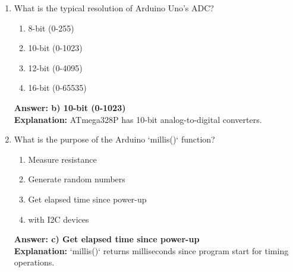 \documentclass{article}
\begin{document}
\begin{enumerate}
		\item What is the typical resolution of Arduino Uno's ADC?
		\begin{enumerate}
			\item 8-bit (0-255)
			\item 10-bit (0-1023)
			\item 12-bit (0-4095)
			\item 16-bit (0-65535)
		\end{enumerate}
		\textbf{Answer: b) 10-bit (0-1023)} \\
		\textbf{Explanation:} ATmega328P has 10-bit analog-to-digital converters.
		
		\item What is the purpose of the Arduino `millis()` function?
		\begin{enumerate}
			\item Measure resistance
			\item Generate random numbers
			\item Get elapsed time since power-up
			\item with I2C devices
		\end{enumerate}
		\textbf{Answer: c) Get elapsed time since power-up} \\
		\textbf{Explanation:} `millis()` returns milliseconds since program start for timing operations.
	\end{enumerate}
	
\end{document}
